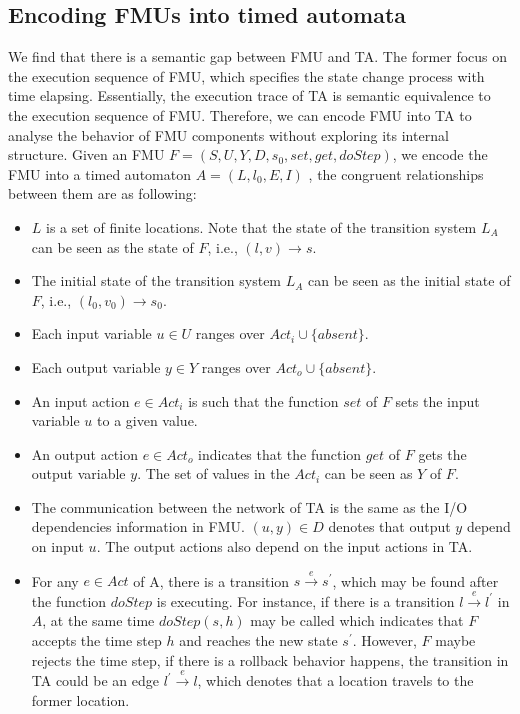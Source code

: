 \subsection{Encoding FMUs into timed automata}
We find that there is a semantic gap between FMU and TA. The former focus on the execution sequence of FMU, which specifies the state change process with time elapsing. Essentially, the execution trace of TA is semantic equivalence to the execution sequence of FMU. Therefore, we can encode FMU into TA to analyse the behavior of FMU components without exploring its internal structure. 
Given an FMU $F=(S,U,Y,D,s_{0},set,get,doStep)$, we encode the FMU into a timed automaton $\textit{A}=(L,l_{0},E,I)$ , the congruent relationships between them are as following:
\begin{itemize}
\item
$L$ is a set of finite locations. Note that the state of the transition system $L_{\textit{A}}$ can be seen as the state of $F$, i.e., $(l,v) \rightarrow s$.
\item
The initial state of the transition system $L_{\textit{A}}$ can be seen as the initial state of $F$, i.e., $(l_{0},v_{0}) \rightarrow s_{0}$. 
\item
Each input variable $u \in U$ ranges over $Act_{i} \cup \{absent\}$.
\item
Each output variable $y \in Y$ ranges over $Act_{o} \cup \{absent\}$.
\item
An input action $e \in Act_{i}$ is such that the function $set$ of $F$ sets the input variable $u$ to a given value. 
\item
An output action $e \in Act_{o}$ indicates that the function $get$ of $F$ gets the output variable $y$. The set of values in the $Act_{i}$ can be seen as $Y$ of $F$.  
\item
The communication between the network of TA is the same as the I/O dependencies information in FMU. $(u,y) \in D$ denotes that output $y$ depend on input $u$. The output actions also depend on the input actions in TA.
\item
For any $e \in Act$ of A, there is a transition $s \xrightarrow{e} s^{\prime}$, which may be found after the function $doStep$ is executing. For instance, if there is a transition $l \xrightarrow{e} l^{\prime}$ in $A$, at the same time $doStep(s,h)$ may be called which indicates that $F$ accepts the time step $h$ and reaches the new state $s^{\prime}$. However, $F$ maybe rejects the time step, if there is a rollback behavior happens, the transition in TA could be an edge $l^{\prime} \xrightarrow{e} l$, which denotes that a location travels to the former location.

\end{itemize}
